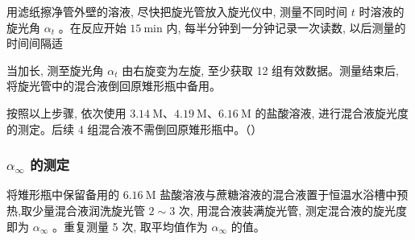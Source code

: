用滤纸擦净管外壁的溶液, 尽快把旋光管放入旋光仪中, 测量不同时间 $t$ 时溶液的旋光角 $\alpha_t$ 。在反应开始 $15 \mathrm{~min}$ 内, 每半分钟到一分钟记录一次读数, 以后测量的时间间隔适

当加长, 测至旋光角 $\alpha_t$ 由右旋变为左旋, 至少获取 12 组有效数据。测量结束后, 将旋光管中的混合液倒回原雉形瓶中备用。

按照以上步骤, 依次使用 $3.14 \mathrm{~M}$、$4.19 \mathrm{~M}$、$6.16 \mathrm{~M}$ 的盐酸溶液, 进行混合液旋光度的测定。后续 4 组混合液不需倒回原雉形瓶中。（）

\subsubsection{$\alpha_{\infty}$ 的测定}

将雉形瓶中保留备用的 $6.16 \mathrm{~M}$ 盐酸溶液与蔗糖溶液的混合液置于恒温水浴槽中预热,取少量混合液润洗旋光管 $2 \sim 3$ 次, 用混合液装满旋光管, 测定混合液的旋光度即为 $\alpha_{\infty}$ 。重复测量 5 次, 取平均值作为 $\alpha_{\infty}$ 的值。

